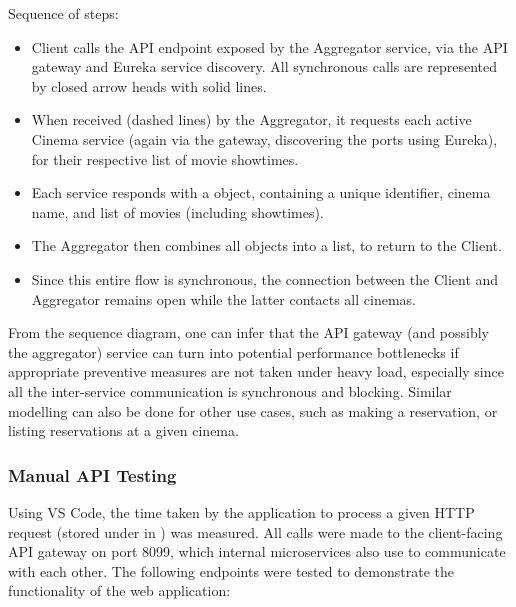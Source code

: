 Sequence of steps:
\begin{itemize}
  \item Client calls the API endpoint  exposed by the Aggregator service, via the API gateway and Eureka service discovery. All synchronous calls are represented by closed arrow heads with solid lines.
  \item When received (dashed lines) by the Aggregator, it requests each active Cinema service (again via the gateway, discovering the ports using Eureka), for their respective list of movie showtimes.
  \item Each service responds with a  object, containing a unique identifier, cinema name, and list of movies (including showtimes).
  \item The Aggregator then combines all  objects into a list, to return to the Client.
  \item Since this entire flow is synchronous, the connection between the Client and Aggregator remains open while the latter contacts all cinemas.
\end{itemize}

From the sequence diagram, one can infer that the API gateway (and possibly the aggregator) service can turn into potential performance bottlenecks if appropriate preventive measures are not taken under heavy load, especially since all the inter-service communication is synchronous and blocking. Similar modelling can also be done for other use cases, such as making a reservation, or listing reservations at a given cinema.

\subsubsection{Manual API Testing}

Using VS Code, the time taken by the application to process a given HTTP request (stored under  in ) was measured. All calls were made to the client-facing API gateway on port 8099, which internal microservices also use to communicate with each other. The following endpoints were tested to demonstrate the functionality of the web application:

